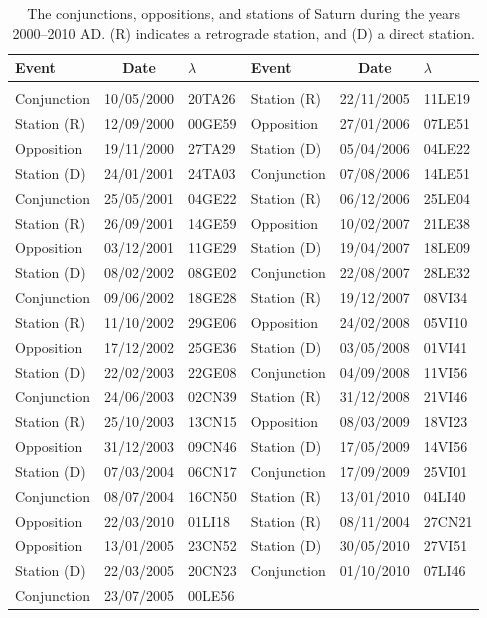 \clearpage
\begin{table}[!h]\centering
\vspace{0.25cm}
{%
\begin{tabular}{lcl|lcl}
Event & Date &$\lambda$ & Event & Date &$\lambda$ \\\hline
&&\\[-1.75ex]
Conjunction & 10/05/2000 & 20TA26 &Station (R) & 22/11/2005 & 11LE19\\
Station (R) & 12/09/2000 & 00GE59 &Opposition & 27/01/2006 & 07LE51\\
Opposition & 19/11/2000 & 27TA29&Station (D) & 05/04/2006 & 04LE22\\
Station (D) & 24/01/2001 & 24TA03&Conjunction & 07/08/2006 & 14LE51\\
Conjunction & 25/05/2001 & 04GE22&Station (R) & 06/12/2006 & 25LE04\\
Station (R) & 26/09/2001 & 14GE59&Opposition & 10/02/2007 & 21LE38\\
Opposition & 03/12/2001 & 11GE29&Station (D) & 19/04/2007 & 18LE09\\
Station (D) & 08/02/2002 & 08GE02&Conjunction & 22/08/2007 & 28LE32\\
Conjunction & 09/06/2002 & 18GE28&Station (R) & 19/12/2007 & 08VI34\\
Station (R) & 11/10/2002 & 29GE06&Opposition & 24/02/2008 & 05VI10\\
Opposition & 17/12/2002 & 25GE36&Station (D) & 03/05/2008 & 01VI41\\
Station (D) & 22/02/2003 & 22GE08&Conjunction & 04/09/2008 & 11VI56\\
Conjunction & 24/06/2003 & 02CN39&Station (R) & 31/12/2008 & 21VI46\\
Station (R) & 25/10/2003 & 13CN15&Opposition & 08/03/2009 & 18VI23\\
Opposition & 31/12/2003 & 09CN46&Station (D) & 17/05/2009 & 14VI56\\
Station (D) & 07/03/2004 & 06CN17&Conjunction & 17/09/2009 & 25VI01\\
Conjunction & 08/07/2004 & 16CN50&Station (R) & 13/01/2010 & 04LI40\\
Opposition & 22/03/2010 & 01LI18&Station (R) & 08/11/2004 & 27CN21\\
Opposition & 13/01/2005 & 23CN52&Station (D) & 30/05/2010 & 27VI51\\
Station (D) & 22/03/2005 & 20CN23&Conjunction & 01/10/2010 & 07LI46\\
Conjunction & 23/07/2005 & 00LE56&&\\
\end{tabular}}
\caption{The conjunctions, oppositions, and stations of Saturn
during the years 2000--2010 AD. (R) indicates a retrograde station, and (D)
a direct station.}\label{vtsaturn}
\end{table}
